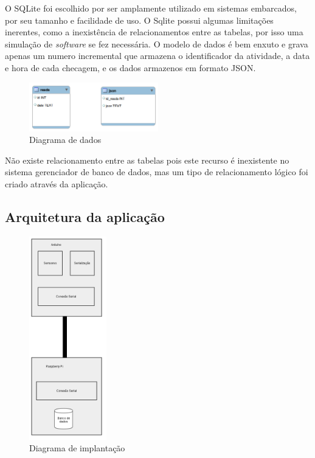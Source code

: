 \documentclass[final,12pt, times, 5p, twocolumn]{elsarticle}
\begin{document}
O SQLite foi escolhido por ser amplamente utilizado em sistemas embarcados, por seu tamanho e facilidade de uso. O Sqlite possui algumas limitações inerentes, como a inexistência de relacionamentos entre as tabelas, por isso uma simulação de \textit{software} se fez necessária. O modelo de dados é bem enxuto e grava apenas um numero incremental que armazena o identificador da atividade, a data e hora de cada checagem, e os dados armazenos em formato JSON.

\begin{figure}[ht!]
\centering
\includegraphics[width=0.5\textwidth]{db.png}
\caption{\label{fig:db}Diagrama de dados}
\end{figure}

Não existe relacionamento entre as tabelas pois este recurso é inexistente no sistema gerenciador de banco de dados, mas um tipo de relacionamento lógico foi criado através da aplicação.

\subsection{Arquitetura da aplicação}

\begin{figure}[ht!]
\centering
\includegraphics[width=0.3\textwidth]{deployment.png}
\caption{\label{fig:mega}Diagrama de implantação}
\end{figure}
\end{document}
